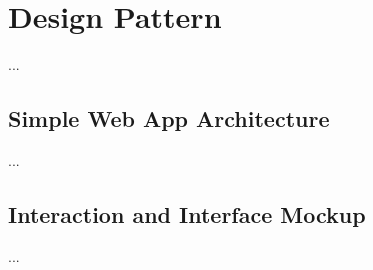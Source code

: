 \section{Design Pattern}
\label{sec:design-pattern}

...

\subsection{Simple Web App Architecture}

...


\subsection{Interaction and Interface Mockup}

...
